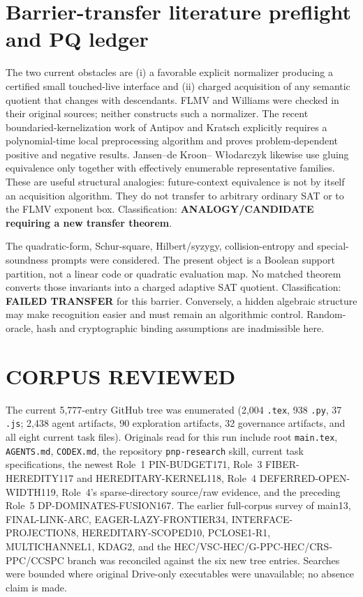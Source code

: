 \documentclass[11pt]{article}
\begin{document}
\section{Barrier-transfer literature preflight and PQ ledger}
The two current obstacles are (i) a favorable explicit normalizer producing
a certified small touched-live interface and (ii) charged acquisition of any
semantic quotient that changes with descendants.  FLMV and Williams were
checked in their original sources; neither constructs such a normalizer.
The recent boundaried-kernelization work of Antipov and Kratsch explicitly
requires a polynomial-time local preprocessing algorithm and proves
problem-dependent positive and negative results.  Jansen--de Kroon--
W\l{}odarczyk likewise use gluing equivalence only together with effectively
enumerable representative families.  These are useful structural analogies:
future-context equivalence is not by itself an acquisition algorithm.
They do not transfer to arbitrary ordinary SAT or to the FLMV exponent box.
Classification: \textbf{ANALOGY/CANDIDATE requiring a new transfer theorem}.

The quadratic-form, Schur-square, Hilbert/syzygy, collision-entropy and
special-soundness prompts were considered.  The present object is a Boolean
support partition, not a linear code or quadratic evaluation map.  No
matched theorem converts those invariants into a charged adaptive SAT
quotient.  Classification: \textbf{FAILED TRANSFER} for this barrier.
Conversely, a hidden algebraic structure may make recognition easier and
must remain an algorithmic control.  Random-oracle, hash and cryptographic
binding assumptions are inadmissible here.

\section{CORPUS REVIEWED}
The current 5,777-entry GitHub tree was enumerated (2,004 \texttt{.tex},
938 \texttt{.py}, 37 \texttt{.js}; 2,438 agent artifacts, 90 exploration
artifacts, 32 governance artifacts, and all eight current task files).
Originals read for this run include root \texttt{main.tex},
\texttt{AGENTS.md}, \texttt{CODEX.md}, the repository
\texttt{pnp-research} skill, current task specifications, the newest Role~1
PIN-BUDGET171, Role~3 FIBER-HEREDITY117 and HEREDITARY-KERNEL118, Role~4
DEFERRED-OPEN-WIDTH119, Role~4's sparse-directory source/raw evidence, and
the preceding Role~5 DP-DOMINATES-FUSION167.  The earlier full-corpus survey
of main13, FINAL-LINK-ARC, EAGER-LAZY-FRONTIER34,
INTERFACE-PROJECTION8, HEREDITARY-SCOPED10, PCLOSE1-R1, MULTICHANNEL1,
KDAG2, and the HEC/VSC-HEC/G-PPC-HEC/CRS-PPC/CCSPC branch was reconciled
against the six new tree entries.  Searches were bounded where original
Drive-only executables were unavailable; no absence claim is made.
\end{document}

